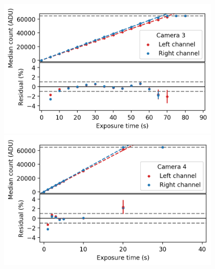 \begin{colsection}
\begin{colsection}
\begin{figure}[p]
\begin{center}
        \begin{minipage}[t]{0.47\textwidth}\vspace{10pt}
            \includegraphics[width=\linewidth]{images/detectors/lin_3.png}
        \end{minipage}
        \begin{minipage}[t]{0.47\textwidth}\vspace{10pt}
            \includegraphics[width=\linewidth]{images/detectors/lin_4.png}
        \end{minipage}


\end{center}
\end{figure}
\end{colsection}
\end{colsection}
